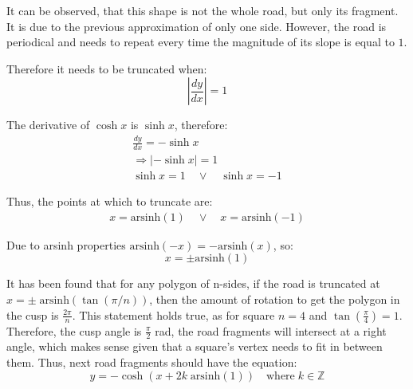 \documentclass[12pt]{article}
\begin{document}
        It can be observed, that this shape is not the whole road, but only its fragment. It is due to the previous approximation of only one side. However, the road is periodical and needs to repeat every time the magnitude of its slope is equal to $1$\cite{Hall_Wagon_1992}. %

        Therefore it needs to be truncated when:
        \begin{equation}
            | \frac{dy}{dx} | = 1
        \end{equation}

        The derivative of $\cosh x$ is $\sinh x$, therefore:
        \begin{align*}
            \frac{dy}{dx} = - \sinh x \\
            \Rightarrow | - \sinh x | = 1 \\
            \sinh x = 1 \quad\lor\quad \sinh x = -1
        \end{align*}

        Thus, the points at which to truncate are:
        \begin{align*}
            x = \text{arsinh}(1) \quad\lor\quad x = \text{arsinh}(-1)
        \end{align*}

        Due to arsinh properties $\text{arsinh}(-x) = - \text{arsinh}(x)$, so:
        \begin{equation}
            x = \pm \text{arsinh}(1)
        \end{equation} 

        It has been found that for any polygon of n-sides, if the road is truncated at $x = \pm \; \text{arsinh}(\tan(\pi / n))$, then the amount of rotation to get the polygon in the cusp is $\frac{2\pi}{n}$\cite{Hall_Wagon_1992}. This statement holds true, as for square $n=4$ and $\tan(\frac{\pi}{4}) = 1$. Therefore, the cusp angle is $\frac{\pi}{2}$ rad, the road fragments will intersect at a right angle, which makes sense given that a square's vertex needs to fit in between them. Thus, next road fragments should have the equation\cite{Hall_Wagon_1992}:
        \begin{equation}
            y = - \cosh (x + 2k \;\text{arsinh}(1) ) \quad \text{where}\; k \in \mathbb{Z}
        \end{equation}
        
\end{document}
